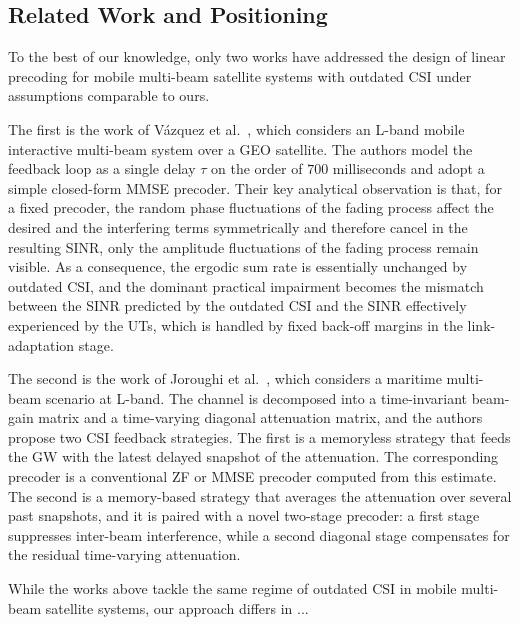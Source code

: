 \subsection*{Related Work and Positioning}
\label{subsection:related_work_and_position}

To the best of our knowledge, only two works have addressed the design of linear precoding for mobile multi-beam satellite systems with outdated \ac{CSI} under assumptions comparable to ours.

The first is the work of Vázquez et al.~\cite{10_delayed_csi_precoding_for_satellites_spain}, which considers an L-band mobile interactive multi-beam system over a \ac{GEO} satellite. 
The authors model the feedback loop as a single delay $\tau$ on the order of $700$ milliseconds and adopt a simple closed-form \ac{MMSE} precoder.
Their key analytical observation is that, for a fixed precoder, the random phase fluctuations of the fading process affect the desired and the interfering terms symmetrically and therefore cancel in the resulting \ac{SINR}, only the amplitude fluctuations of the fading process remain visible. 
As a consequence, the ergodic sum rate is essentially unchanged by outdated \ac{CSI}, and the dominant practical impairment becomes the mismatch between the \ac{SINR} predicted by the outdated \ac{CSI} and the \ac{SINR} effectively experienced by the \acp{UT}, which is handled by fixed back-off margins in the link-adaptation stage.

The second is the work of Joroughi et al.~\cite{11_delayed_csi_precoding_for_satellite_luxembourg}, which considers a maritime multi-beam scenario at L-band. 
The channel is decomposed into a time-invariant beam-gain matrix and a time-varying diagonal attenuation matrix, and the authors propose two \ac{CSI} feedback strategies.
The first is a memoryless strategy that feeds the \ac{GW} with the latest delayed snapshot of the attenuation. The corresponding precoder is a conventional \ac{ZF} or \ac{MMSE} precoder computed from this estimate.
The second is a memory-based strategy that averages the attenuation over several past snapshots, and it is paired with a novel two-stage precoder: a first stage suppresses inter-beam interference, while a second diagonal stage compensates for the residual time-varying attenuation.

While the works above tackle the same regime of outdated \ac{CSI} in mobile multi-beam satellite systems, our approach differs in ...
